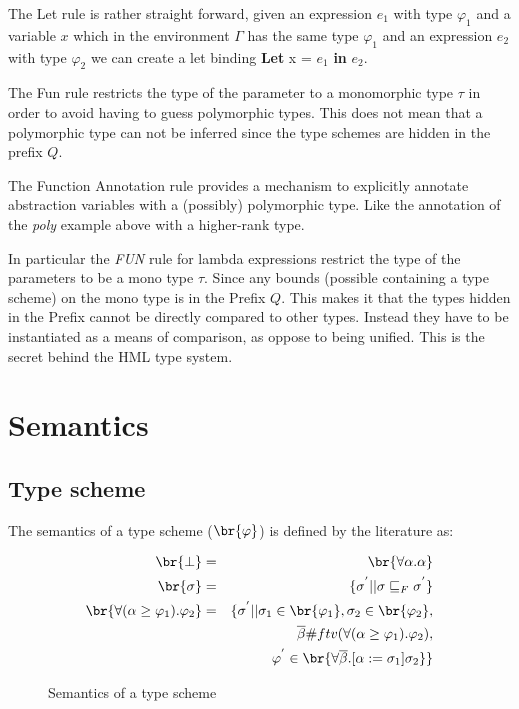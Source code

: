 The Let rule is rather straight forward, given an expression $e_1$ with type $\varphi_1$ and a variable $x$ which in the environment $\Gamma$ has the same type $\varphi_1$ and an expression $e_2$ with type $\varphi_2$ we can create a let binding \textbf{Let} x = $e_1$ \textbf{in} $e_2$.

\begin{prooftree}
\end{prooftree}

The Fun rule restricts the type of the parameter to a monomorphic type $\tau$ in order to avoid having to guess polymorphic types. This does not mean that a polymorphic type can not be inferred since the type schemes are hidden in the prefix $Q$.

\begin{prooftree}
\end{prooftree}

The Function Annotation rule provides a mechanism to explicitly annotate abstraction variables with a (possibly) polymorphic type. Like the annotation of the \textit{poly} example above with a higher-rank type.

In particular the \textit{FUN} rule for lambda expressions restrict the type of the parameters to be a mono type $\tau$. Since any bounds (possible containing a type scheme) on the mono type is in the Prefix $Q$. This makes it that the types hidden in the Prefix cannot be directly compared to other types. Instead they have to be instantiated as a means of comparison, as oppose to being unified. This is the secret behind the HML type system.  

\section{Semantics}
\subsection{Type scheme}
The semantics of a type scheme ($\br{\varphi}$) is defined by the literature\cite{HML} as:
\begin{figure}[H]
\begin{eqnarray*}
\br{\bot} & = & \br{\forall\alpha . \alpha} \\
\br{\sigma} & = & \{ \sigma^{'} || \sigma \sqsubseteq_F \sigma^{'} \} \\
\br{\forall(\alpha \geq \varphi_1).\varphi_2} & = & \{ \sigma^{'} || \sigma_1  \in \br{\varphi_1}, \sigma_2 \in \br{\varphi_2}, \\ 
   &\mbox{   }& \mbox{   } \overline{\beta} \# ftv(\forall(\alpha \geq \varphi_1).\varphi_2), \\
   &\mbox{   }& \mbox{   } \varphi^{'} \in \br{\forall\overline{\beta}.\lbrack \alpha := \sigma_1 \rbrack\sigma_2}  \} 
\end{eqnarray*}
\caption{Semantics of a type scheme}
\end{figure}


